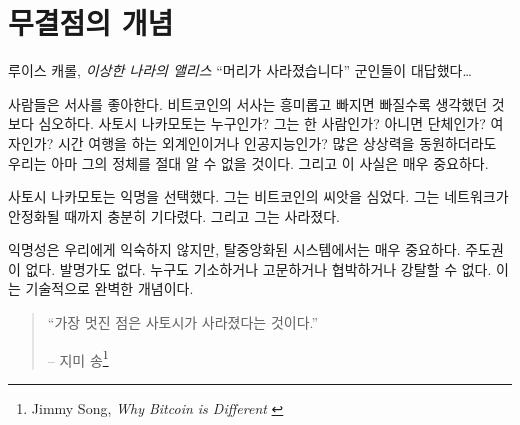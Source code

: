 \chapter{무결점의 개념}
\label{les:5}

\begin{chapquote}{루이스 캐롤, \textit{이상한 나라의 앨리스}}
	\enquote{머리가 사라졌습니다} 군인들이 대답했다\ldots
\end{chapquote}

사람들은 서사를 좋아한다. 
비트코인의 서사는 흥미롭고 빠지면 빠질수록 생각했던 것보다 심오하다. 
사토시 나카모토는 누구인가? 그는 한 사람인가? 아니면 단체인가? 여자인가? 
시간 여행을 하는 외계인이거나 인공지능인가? 
많은 상상력을 동원하더라도 우리는 아마 그의 정체를 절대 알 수 없을 것이다.
그리고 이 사실은 매우 중요하다.

사토시 나카모토는 익명을 선택했다. 
그는 비트코인의 씨앗을 심었다. 
그는 네트워크가 안정화될 때까지 충분히 기다렸다.
그리고 그는 사라졌다.

익명성은 우리에게 익숙하지 않지만, 탈중앙화된 시스템에서는 매우 중요하다.
주도권이 없다.
발명가도 없다. 
누구도 기소하거나 고문하거나 협박하거나 강탈할 수 없다. 
이는 기술적으로 완벽한 개념이다.

\begin{quotation}\begin{samepage}
		\enquote{가장 멋진 점은 사토시가 사라졌다는 것이다.}
		\begin{flushright} -- 지미 송\footnote{Jimmy Song, \textit{Why Bitcoin is Different} \cite{bitcoin-different}}
\end{flushright}\end{samepage}\end{quotation}

\newpage

